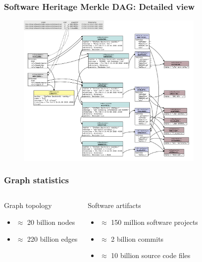 \documentclass[aspectratio=169,xcolor=table]{beamer}
\begin{document}
    \begin{frame}
        \frametitle{Software Heritage Merkle DAG: Detailed view}
        \begin{figure}
            \centering
            \includegraphics[height=7.5cm]{../img/swh-merkle-dag}
        \end{figure}
    \end{frame}

    \begin{frame}
        \frametitle{Graph statistics}
        \begin{columns}
            \begin{block}{Graph topology}
                \begin{itemize}
                    \item $\approx$ 20 billion nodes
                    \item $\approx$ 220 billion edges
                \end{itemize}
            \end{block}

            \begin{block}{Software artifacts}
                \begin{itemize}
                    \item $\approx$ 150 million software projects
                    \item $\approx$ 2 billion commits
                    \item $\approx$ 10 billion source code files
                \end{itemize}
            \end{block}
        \end{columns}
    \end{frame}
\end{document}
